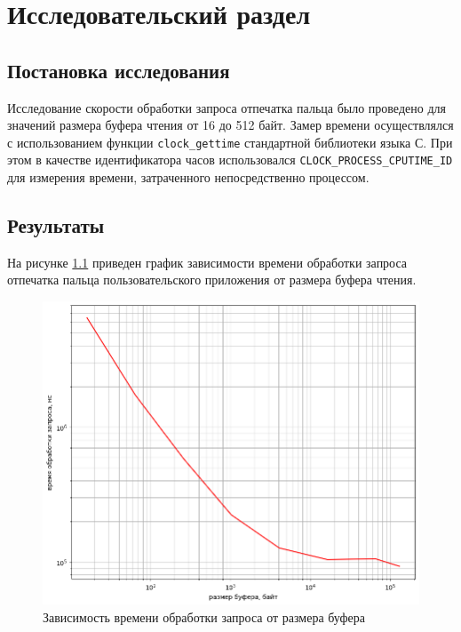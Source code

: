 \chapter{Исследовательский раздел}

\section{Постановка исследования}

Исследование скорости обработки запроса отпечатка пальца было проведено для значений размера буфера чтения от 16 до 512 байт. Замер времени осуществлялся с использованием функции \texttt{clock\_gettime} стандартной библиотеки языка С. При этом в качестве идентификатора часов использовался \texttt{CLOCK\_PROCESS\_CPUTIME\_ID} для измерения времени, затраченного непосредственно процессом.

\section{Результаты}

На рисунке \ref{fig:research} приведен график зависимости времени обработки запроса отпечатка пальца пользовательского приложения от размера буфера чтения.

\begin{figure}[h!]
    \centering
    \includegraphics[width=\textwidth]{img/research.png}
    \caption{Зависимость времени обработки запроса от размера буфера}
    \label{fig:research}
\end{figure}
